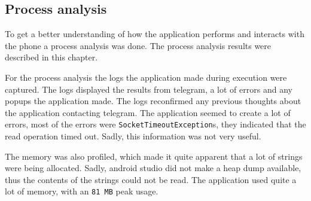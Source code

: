 \subsection{Process analysis}

To get a better understanding of how the application performs and interacts with the phone a process analysis was done.
The process analysis results were described in this chapter.

For the process analysis the logs the application made during execution were captured.
The logs displayed the results from telegram, a lot of errors and any popups the application made.
The logs reconfirmed any previous thoughts about the application contacting telegram.
The application seemed to create a lot of errors, most of the errors were \texttt{SocketTimeoutException}s, they indicated that the read operation timed out.
Sadly, this information was not very useful.

The memory was also profiled, which made it quite apparent that a lot of strings were being allocated.
Sadly, android studio did not make a heap dump available, thus the contents of the strings could not be read.
The application used quite a lot of memory, with an \texttt{81 MB} peak usage.